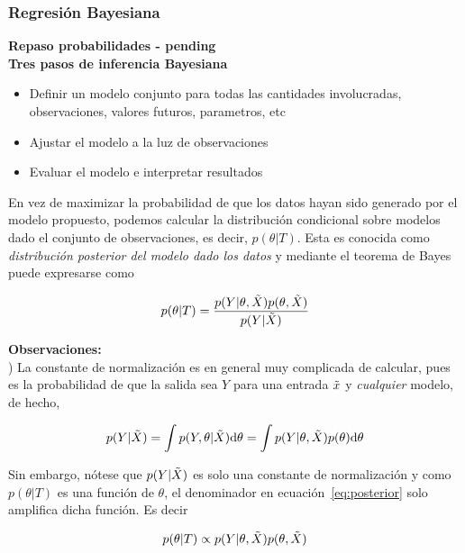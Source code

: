 \subsubsection{Regresión Bayesiana} %
\label{ssub:map}
\noindent\textbf{Repaso probabilidades - pending}\\

\noindent\textbf{Tres pasos de inferencia Bayesiana}
\begin{itemize}
	\item Definir un modelo conjunto para todas las cantidades involucradas, observaciones, valores futuros, parametros, etc
	\item Ajustar el modelo a la luz de observaciones
	\item Evaluar el modelo e interpretar resultados
\end{itemize}




En vez de maximizar la probabilidad de que los datos hayan sido generado por el modelo propuesto, podemos calcular la distribución condicional sobre modelos dado el conjunto de observaciones, es decir, $p(\theta|T)$. Esta es conocida como \emph{distribución posterior del modelo dado los datos} y mediante el teorema de Bayes puede expresarse como

\begin{equation}
	p(\theta|T)=\frac{p(Y|\theta,\tilde{X})p(\theta,\tilde{X})}{p(Y|\tilde{X})}
	\label{eq:posterior}
\end{equation}

\noindent\textbf{Observaciones:}\\

) La constante de normalización es en general muy complicada de calcular, pues es la probabilidad de que la salida sea $Y$ para una entrada $\tilde{x}$ y \emph{cualquier} modelo, de hecho, 

\begin{equation}
		p(Y|\tilde{X}) 	= 	\int p(Y,\theta|\tilde{X}){\text d} \theta 
					= 	\int p(Y|\theta,\tilde{X}) p(\theta) {\text d} \theta
\end{equation}

Sin embargo, nótese que $p(Y|\tilde{X})$ es solo una constante de normalización y como $p(\theta|T)$ es una función de $\theta$, el denominador en ecuación~\eqref{eq:posterior} solo amplifica dicha función. Es decir 

\begin{equation}
	p(\theta|T)\propto p(Y|\theta,\tilde{X})p(\theta,\tilde{X})
	\label{eq:posterior2}
\end{equation}

